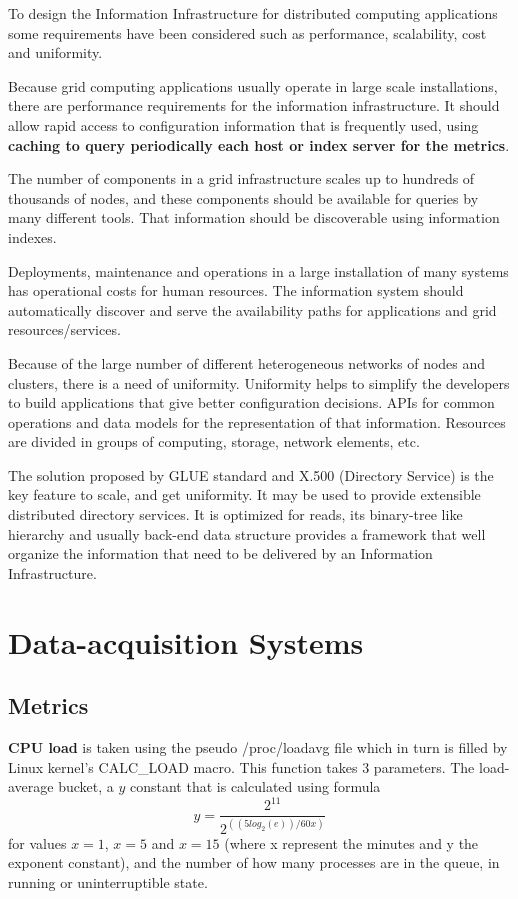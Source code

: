 To design the Information Infrastructure for distributed computing applications some requirements have been considered such as performance, scalability, cost and uniformity.

Because grid computing applications usually operate in large scale installations, there are performance requirements for the information infrastructure. It should allow rapid access to configuration information that is frequently used, using {\bf caching to query periodically each host or index server for the metrics}.

The number of components in a grid infrastructure scales up to hundreds of thousands of nodes, and these components should be available for queries by many different tools. That information should be discoverable using information indexes.

Deployments, maintenance and operations in a large installation of many systems has operational costs for human resources. The information system should automatically discover and serve the availability paths for applications and grid resources/services.

Because of the large number of different heterogeneous networks of nodes and clusters, there is a need of uniformity. Uniformity helps to simplify the developers to build applications that give better configuration decisions. APIs for common operations and data models for the representation of that information. Resources are divided in groups of computing, storage, network elements, etc.

The solution proposed by GLUE standard and X.500 (Directory Service) is the key feature to scale, and get uniformity. It may be used to provide extensible distributed directory services. It is optimized for reads, its binary-tree like hierarchy and usually back-end data structure provides a framework that well organize the information that need to be delivered by an Information Infrastructure.\cite{mds1}

\section{Data-acquisition Systems}

\subsection{Metrics}\label{subsec:metrics}

{\bf CPU load} is taken using the pseudo /proc/loadavg file which in turn is
filled by Linux kernel's CALC\_LOAD macro. This function takes 3 parameters.
The load-average bucket, a $y$ constant that is calculated using formula
\[
y=\frac{2^{11}}{2^{((5log_2(e))/60x)}}
\]
for values $x=1$, $x=5$ and $x=15$ (where x represent the minutes and y the
exponent constant), and the number of how many processes are in the queue, in
running or uninterruptible state.

